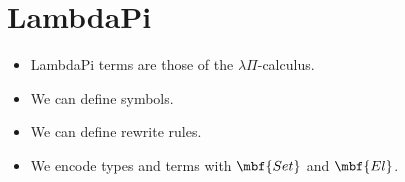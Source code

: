 \documentclass[lualatex, compress, 12pt, handout]{beamer}
\begin{document}






\section{LambdaPi}


\begin{frame}
	\begin{itemize}
		\item<+-> LambdaPi terms are those of the $λΠ$-calculus.
	\end{itemize}
\end{frame}

\begin{frame}
	\begin{itemize}
		\item<+-> We can define symbols.
	\end{itemize}
\end{frame}

\begin{frame}
	\begin{itemize}
		\item<+-> We can define rewrite rules.
	\end{itemize}
\end{frame}

\begin{frame}
	\begin{itemize}
		\item<+-> We encode types and terms with $\mbf{Set}$ and $\mbf{El}$.
	\end{itemize}
\end{frame}
\end{document}
